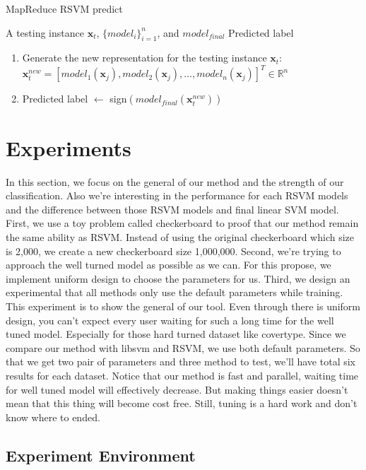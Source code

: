 \documentclass[conference]{IEEEtran}
\begin{document}
\begin{algorithm}
\begin{algorithmic}
\caption{MapReduce RSVM predict}
\label{algo:predict}
\REQUIRE A testing instance $\mathbf{x}_t$, $\{model_i\}^n_{i=1}$, and $model_{final}$
\ENSURE Predicted label
\begin{enumerate}
  \item Generate the new representation for the testing instance $\mathbf{x}_t$:\\
  $\mathbf{x}^{new}_t = [model_1(\mathbf{x}_j),model_2(\mathbf{x}_j),\dots,model_n(\mathbf{x}_j)]^T\in \mathbb{R}^n$
  \item Predicted label $\gets$ sign$(model_{final}(\mathbf{x}^{new}_t))$
\end{enumerate}
\end{algorithmic}
\end{algorithm}


\section{Experiments}
\label{sec:Experiments}
In this section, we focus on the general of our method and the strength of our classification. Also we're interesting in the performance for each RSVM models and the difference between those RSVM models and final linear SVM model. First, we use a toy problem called checkerboard to proof that our method remain the same ability as RSVM. Instead of using the original checkerboard which size is 2,000, we create a new checkerboard size 1,000,000. Second, we're trying to approach the well turned model as possible as we can. For this propose, we implement uniform design to choose the parameters for us. Third, we design an experimental that all methods only use the default parameters while training. This experiment is to show the general of our tool. Even through there is uniform design, you can't expect every user waiting for such a long time for the well tuned model. Especially for those hard turned dataset like covertype. Since we compare our method with libsvm and RSVM, we use both default parameters. So that we get two pair of parameters and three method to test, we'll have total six results for each dataset.  Notice that our method is fast and parallel, waiting time for well tuned model will effectively decrease. But making things easier doesn't mean that this thing will become cost free. Still, tuning is a hard work and don't know where to ended.

\subsection{Experiment Environment}
\end{document}
